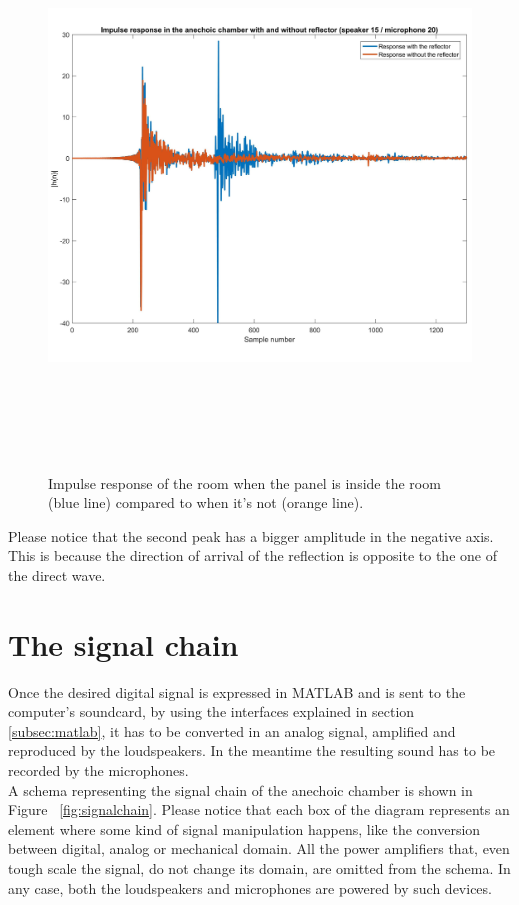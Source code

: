 \begin{figure}[H]
\centering
\includegraphics[width=14.5cm,height=15cm,keepaspectratio]{Figures/ir_ref_noref}
\decoRule
\caption[IR reflective surface]{Impulse response of the room when the panel is inside the room (blue line) compared to when it's not (orange line).}
\label{fig:irrefnoref}
\end{figure}

Please notice that the second peak has a bigger amplitude in the negative axis. This is because the direction of arrival of the reflection is opposite to the one of the direct wave.


\section{The signal chain}{}
\label{subsec:sigchain}

Once the desired digital signal is expressed in MATLAB and is sent to the computer's soundcard, by using the interfaces explained in section \ref{subsec:matlab}, it has to be converted in an analog signal, amplified and reproduced by the loudspeakers. In the meantime the resulting sound has to be recorded by the microphones.
\\
A schema representing the signal chain of the anechoic chamber is shown in Figure ~\ref{fig:signalchain}. Please notice that each box of the diagram represents an element where some kind of signal manipulation happens, like the conversion between digital, analog or mechanical domain. All the power amplifiers that, even tough scale the signal, do not change its domain, are omitted from the schema. In any case, both the loudspeakers and microphones are powered by such devices.

